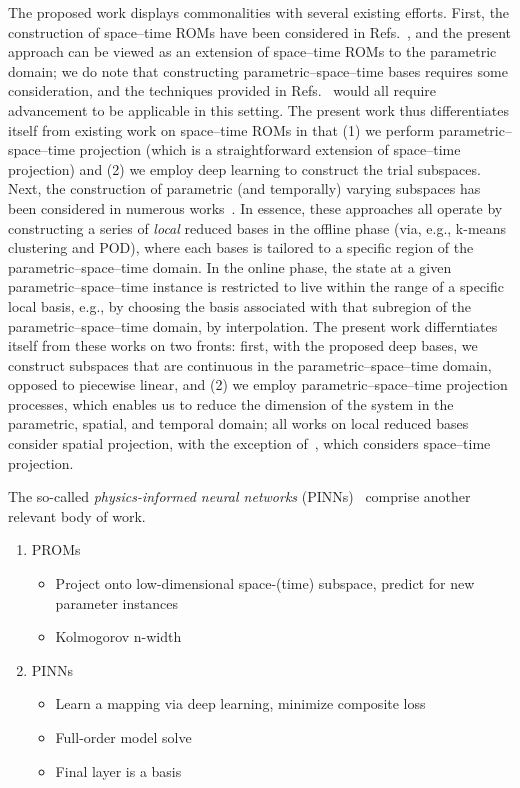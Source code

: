 \documentclass[3p,computermodern,10pt]{elsarticle}
\begin{document}
The proposed work displays commonalities with several existing efforts. First, the construction of space--time ROMs have been considered in Refs.~\cite{choi_stlspg,constantine_strom,URBAN2012203,Yano2014ASC}, and the present approach can be viewed as an extension of space--time ROMs to the parametric domain; we do note that constructing parametric--space--time bases requires some consideration, and the techniques provided in Refs.~\cite{choi_stlspg,constantine_strom,URBAN2012203,Yano2014ASC} would all require advancement to be applicable in this setting. The present work thus differentiates itself from existing work on space--time ROMs in that (1) we perform parametric--space--time projection (which is a straightforward extension of space--time projection) and (2) we employ deep learning to construct the trial subspaces. Next, the construction of parametric (and temporally) varying subspaces has been considered in numerous works~\cite{EfPaRo10,HaDiOh11,DiKaHa12,amsallem2012nonlinear,AmsZahWas15}. In essence, these approaches all operate by constructing a series of \textit{local} reduced bases in the offline phase (via, e.g., k-means clustering and POD), where each bases is tailored to a specific region of the parametric--space--time domain. In the online phase, the state at a given parametric--space--time instance is restricted to live within the range of a specific local basis, e.g., by choosing the basis associated with that subregion of the parametric--space--time domain, by interpolation. The present work differntiates itself from these works on two fronts: first, with the proposed deep bases, we construct subspaces that are continuous in the parametric--space--time domain, opposed to piecewise linear, and (2) we employ parametric--space--time projection processes, which enables us to reduce the dimension of the system in the parametric, spatial, and temporal domain; all works on local reduced bases consider spatial projection, with the exception of~\cite{Shimizu}, which considers space--time projection. 

The so-called \textit{physics-informed neural networks} (PINNs)~\cite{RaPeKa18} comprise another relevant body of work.  
\begin{enumerate}
\item PROMs
\begin{itemize}
\item Project onto low-dimensional space-(time) subspace, predict for new parameter instances
\item Kolmogorov n-width
\end{itemize}
\item PINNs
\begin{itemize}
\item Learn a mapping via deep learning, minimize composite loss
\item Full-order model solve
\item Final layer is a basis
\end{itemize}
\end{enumerate}  
\end{document}
